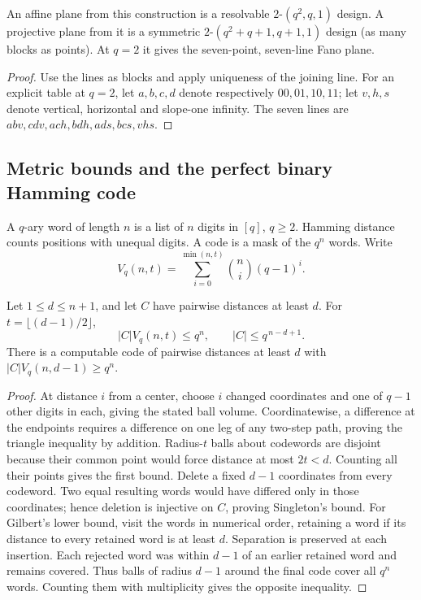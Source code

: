 \begin{corollary}\label{result47}
An affine plane from this construction is a resolvable
\(2\)-\((q^2,q,1)\) design. A projective plane from it is a symmetric
\(2\)-\((q^2+q+1,q+1,1)\) design (as many blocks as points).
At \(q=2\) it gives the seven-point, seven-line Fano plane.
\end{corollary}
\begin{proof}
Use the lines as blocks and apply uniqueness of the joining line.
For an explicit table at \(q=2\), let \(a,b,c,d\) denote respectively
\(00,01,10,11\); let \(v,h,s\) denote vertical, horizontal and
slope-one infinity. The seven lines are
\(abv,cdv,ach,bdh,ads,bcs,vhs\).
\end{proof}

\subsection{Metric bounds and the perfect binary Hamming code}

A \(q\)-ary word of length \(n\) is a list of \(n\) digits in \([q]\),
\(q\ge2\). Hamming distance counts positions with unequal digits. A code
is a mask of the \(q^n\) words. Write
\[
 V_q(n,t)=\sum_{i=0}^{\min(n,t)}\binom ni(q-1)^i .
\]

\begin{theorem}\label{result48}
Let \(1\le d\le n+1\), and let \(C\) have pairwise distances at least
\(d\). For \(t=\lfloor(d-1)/2\rfloor\),
\[
 |C|V_q(n,t)\le q^n,\qquad |C|\le q^{\,n-d+1}.
\]
There is a computable code of pairwise distances at least \(d\) with
\(\lvert C\rvert V_q(n,d-1)\ge q^n\).
\end{theorem}
\begin{proof}
At distance \(i\) from a center, choose \(i\) changed coordinates and
one of \(q-1\) other digits in each, giving the stated ball volume.
Coordinatewise, a difference at the endpoints requires a difference on
one leg of any two-step path, proving the triangle inequality by addition.
Radius-\(t\) balls about codewords are disjoint because their common
point would force distance at most \(2t<d\). Counting all their points
gives the first bound. Delete a fixed \(d-1\) coordinates from every
codeword. Two equal resulting words would have differed only in those
coordinates; hence deletion is injective on \(C\), proving Singleton's
bound. For Gilbert's lower bound, visit the words in numerical order,
retaining a word if its distance to every retained word is at least \(d\).
Separation is preserved at each insertion. Each rejected word was within
\(d-1\) of an earlier retained word and remains covered. Thus balls of
radius \(d-1\) around the final code cover all \(q^n\) words. Counting
them with multiplicity gives the opposite inequality.
\end{proof}

